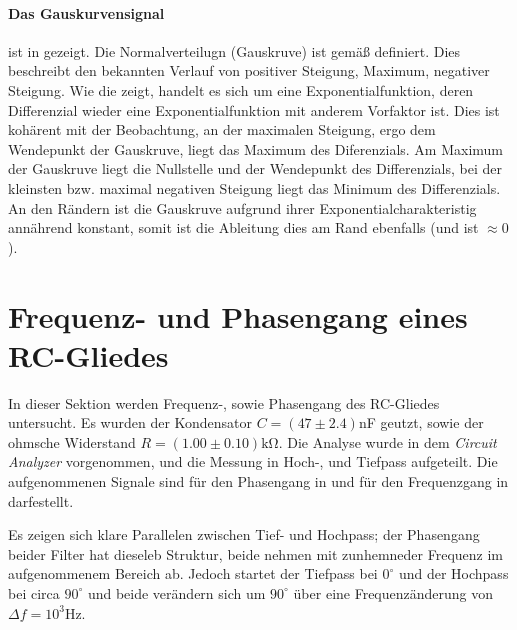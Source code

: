 \paragraph{Das Gauskurvensignal} ist in  gezeigt. Die Normalverteilugn (Gauskruve) ist gemäß
definiert. Dies beschreibt den bekannten Verlauf von positiver Steigung, Maximum, negativer Steigung. Wie die  zeigt, handelt es sich um eine Exponentialfunktion, deren Differenzial wieder eine Exponentialfunktion mit anderem Vorfaktor ist. Dies ist kohärent mit der Beobachtung, an der maximalen Steigung, ergo dem Wendepunkt der Gauskruve, liegt das Maximum des Diferenzials. Am Maximum der Gauskruve liegt die Nullstelle und der Wendepunkt des Differenzials, bei der kleinsten bzw. maximal negativen Steigung liegt das Minimum des Differenzials. An den Rändern ist die Gauskruve aufgrund ihrer Exponentialcharakteristig annährend konstant, somit ist die Ableitung dies am Rand ebenfalls (und ist $\approx 0$).


\section{Frequenz- und Phasengang eines RC-Gliedes}
\label{sec:A3}
In dieser Sektion werden Frequenz-, sowie Phasengang des RC-Gliedes untersucht. Es wurden der Kondensator $C = (47 \pm 2.4)$nF geutzt, sowie der ohmsche Widerstand $R = (1.00 \pm 0.10)\mathrm{k\Omega}$. Die Analyse wurde in dem \emph{Circuit Analyzer} vorgenommen, und die Messung in Hoch-, und Tiefpass aufgeteilt. Die aufgenommenen Signale sind für den Phasengang in  und für den Frequenzgang in  darfestellt.

Es zeigen sich klare Parallelen zwischen Tief- und Hochpass; der Phasengang beider Filter hat dieseleb Struktur, beide nehmen mit zunhemneder Frequenz im aufgenommenem Bereich ab. Jedoch startet der Tiefpass bei $0^\circ$ und der Hochpass bei circa $90^\circ$ und beide verändern sich um $90^\circ$ über eine Frequenzänderung von $\Delta f = 10^3 \mathrm{Hz}$. 


